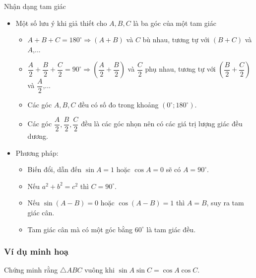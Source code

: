 \begin{dang}{Nhận dạng tam giác}
\begin{itemize}
\item Một số lưu ý khi giả thiết cho $A,B,C$ là ba góc của một tam giác
	\begin{itemize}
		\item $A+B+C=180^\circ \Rightarrow (A+B)$ và $C$ bù nhau, tương tự với $(B+C)$ và $A$,...
		\item $\dfrac{A}{2}+\dfrac{B}{2}+\dfrac{C}{2}=90^\circ \Rightarrow \left(\dfrac{A}{2}+\dfrac{B}{2} \right)$ và $\dfrac{C}{2}$ phụ nhau, tương tự với $\left(\dfrac{B}{2}+\dfrac{C}{2} \right)$ và $\dfrac{A}{2}$,...
		\item Các góc $A,B,C$ đều có số đo trong khoảng $\left(0^\circ;180^\circ \right)$.
		\item Các góc $\dfrac{A}{2},\dfrac{B}{2},\dfrac{C}{2}$ đều là các góc nhọn nên có các giá trị lượng giác đều dương.
	\end{itemize}
\item Phương pháp:
	\begin{itemize}
		\item  Biến đổi, dẫn đến $\sin A = 1$ hoặc $\cos A = 0$ sẽ có $A=90^\circ$.
		\item  Nếu $a^2+b^2=c^2$ thì $C=90^\circ$.
		\item  Nếu $\sin (A - B) = 0$ hoặc $\cos (A - B) = 1$ thì $A=B$, suy ra tam giác cân.
		\item Tam giác cân mà có một góc bằng $60^\circ$ là tam giác đều.
	\end{itemize}
\end{itemize}
\end{dang}

\subsubsection{Ví dụ minh hoạ}
\begin{vd}%
Chứng minh rằng $\triangle ABC$ vuông khi $\sin A\sin C = \cos A\cos C$.
\end{vd}

